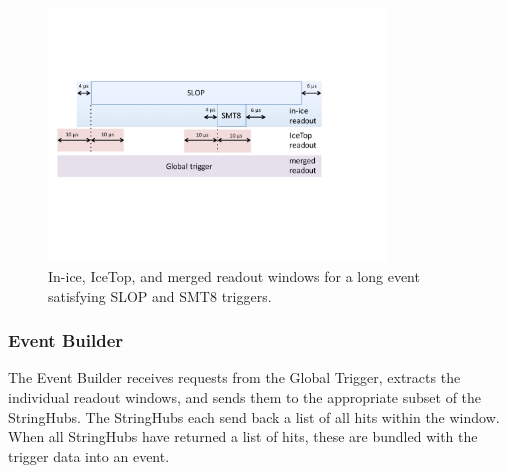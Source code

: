 \begin{figure}[!ht]
 \centering
 \includegraphics[width=0.8\textwidth]{graphics/online/trigger/trigger_readout}
 \caption{In-ice, IceTop, and merged readout windows for a long event
   satisfying SLOP and SMT8 triggers.}
 \label{fig:trigger_readout}
\end{figure}


\subsubsection{\label{sect:online:evbuilder}Event Builder}

The Event Builder receives requests from the Global Trigger, extracts the
individual readout windows, and sends them to the appropriate subset of the
StringHubs.  The StringHubs each send back a list of all hits within the
window. When all StringHubs have returned a list of hits, these are bundled with the trigger data into an event.


